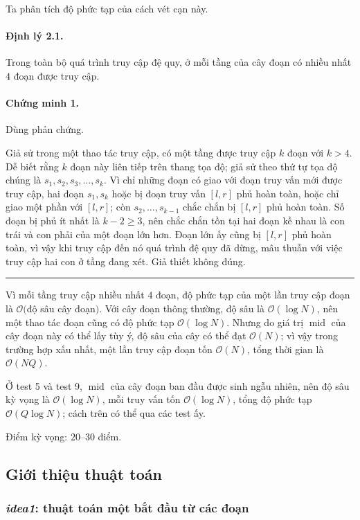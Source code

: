 \documentclass[11pt]{article}
\newcommand{\Oh}{\mathcal{O}}
\newcommand{\qedmark}{\hfill\rule{0.7ex}{0.7ex}}
\begin{document}
Ta phân tích độ phức tạp của cách vét cạn này.

\paragraph{Định lý 2.1.}
Trong toàn bộ quá trình truy cập đệ quy, ở mỗi tầng của cây đoạn có nhiều nhất
\(4\) đoạn được truy cập.

\paragraph{Chứng minh 1.}
Dùng phản chứng.

Giả sử trong một thao tác truy cập, có một tầng được truy cập \(k\) đoạn với
\(k>4\). Dễ biết rằng \(k\) đoạn này liên tiếp trên thang tọa độ; giả sử theo
thứ tự tọa độ chúng là \(s_1,s_2,s_3,\ldots,s_k\). Vì chỉ những đoạn có giao
với đoạn truy vấn mới được truy cập, hai đoạn \(s_1,s_k\) hoặc bị đoạn truy
vấn \([l,r]\) phủ hoàn toàn, hoặc chỉ giao một phần với \([l,r]\); còn
\(s_2,\ldots,s_{k-1}\) chắc chắn bị \([l,r]\) phủ hoàn toàn. Số đoạn bị phủ
ít nhất là \(k-2\ge 3\), nên chắc chắn tồn tại hai đoạn kề nhau là con trái và
con phải của một đoạn lớn hơn. Đoạn lớn ấy cũng bị \([l,r]\) phủ hoàn toàn, vì
vậy khi truy cập đến nó quá trình đệ quy đã dừng, mâu thuẫn với việc truy cập
hai con ở tầng đang xét. Giả thiết không đúng. \qedmark

Vì mỗi tầng truy cập nhiều nhất \(4\) đoạn, độ phức tạp của một lần truy cập
đoạn là \(\Oh(\)độ sâu cây đoạn\()\). Với cây đoạn thông thường, độ sâu là
\(\Oh(\log N)\), nên một thao tác đoạn cũng có độ phức tạp \(\Oh(\log N)\).
Nhưng do giá trị \(\operatorname{mid}\) của cây đoạn này có thể lấy tùy ý, độ
sâu của cây có thể đạt \(\Oh(N)\); vì vậy trong trường hợp xấu nhất, một lần
truy cập đoạn tốn \(\Oh(N)\), tổng thời gian là \(\Oh(NQ)\).

Ở test 5 và test 9, \(\operatorname{mid}\) của cây đoạn ban đầu được sinh ngẫu
nhiên, nên độ sâu kỳ vọng là \(\Oh(\log N)\), mỗi truy vấn tốn
\(\Oh(\log N)\), tổng độ phức tạp \(\Oh(Q\log N)\); cách trên có thể qua các
test ấy.

Điểm kỳ vọng: \(20\)--\(30\) điểm.

\subsection{Giới thiệu thuật toán}

\subsubsection{\emph{idea1}: thuật toán một bắt đầu từ các đoạn}
\end{document}
